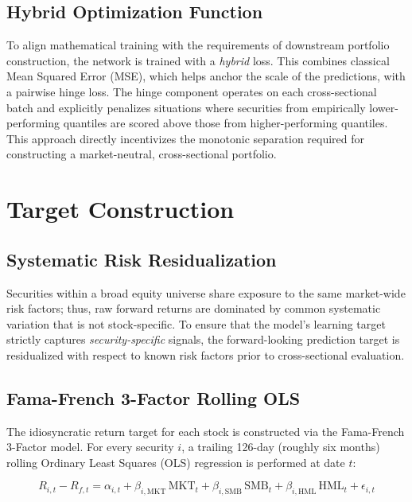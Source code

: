 \subsection*{Hybrid Optimization Function}

To align mathematical training with the requirements of downstream portfolio construction, the network is trained with a \emph{hybrid} loss. This combines classical Mean Squared Error (MSE), which helps anchor the scale of the predictions, with a pairwise hinge loss. The hinge component operates on each cross-sectional batch and explicitly penalizes situations where securities from empirically lower-performing quantiles are scored above those from higher-performing quantiles. This approach directly incentivizes the monotonic separation required for constructing a market-neutral, cross-sectional portfolio.

\section{Target Construction} \label{sec:target-construction}
\subsection*{Systematic Risk Residualization}

Securities within a broad equity universe share exposure to the same market-wide risk factors; thus, raw forward returns are dominated by common systematic variation that is not stock-specific. To ensure that the model's learning target strictly captures \emph{security-specific} signals, the forward-looking prediction target is residualized with respect to known risk factors prior to cross-sectional evaluation.

\subsection*{Fama-French 3-Factor Rolling OLS}

The idiosyncratic return target for each stock is constructed via the Fama-French 3-Factor model. For every security $i$, a trailing 126-day (roughly six months) rolling Ordinary Least Squares (OLS) regression is performed at date $t$:

\begin{equation}
	R_{i,t} - R_{f,t} = \alpha_{i,t} + \beta_{i,\mathrm{MKT}}\,\mathrm{MKT}_t + \beta_{i,\mathrm{SMB}}\,\mathrm{SMB}_t + \beta_{i,\mathrm{HML}}\,\mathrm{HML}_t + \epsilon_{i,t}
\end{equation}

